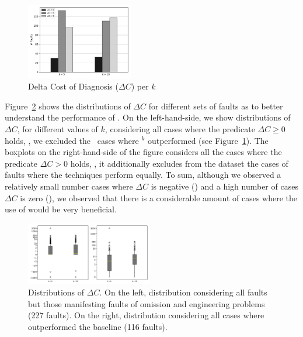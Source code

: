 \documentclass{article}
\begin{document}
\begin{figure}[h]
	\vspace{-0.3cm}
		\centering
		\includegraphics[width=0.415\textwidth]{figures/performance.pdf}
		\vspace{-0.4cm}
		\caption{Delta Cost of Diagnosis ($\Delta{}C$) per $k$}
		\label{fig:diagnosis}
\end{figure}

Figure~\ref{fig:boxplot} shows the distributions of $\Delta{}C$ for
different sets of faults as to better understand the performance of
. 
On the left-hand-side, we show distributions of
$\Delta{}C$, for different values of $k$, considering all cases where
the predicate $\Delta{}C\geq{}0$ holds, \ie{}, we excluded the
\numOutPerformed\ cases where \sfl{}$^{k}$ outperformed 
(see Figure~\ref{fig:diagnosis}). The boxplots on the right-hand-side
of the figure considers all the cases where the predicate
$\Delta{}C>0$ holds, \ie{}, it additionally excludes from the dataset
the cases of faults where the techniques perform equally.
 To sum,
although we observed a relatively small number cases where $\Delta{}C$
is negative (\numOutPerformed) and a high number of cases $\Delta{}C$
is zero (\numEquallyPerformed), we observed that there is a
considerable amount of cases where the use of  would be
very beneficial.

\begin{figure}[h]
		\vspace{-0.2cm}
		\centering
		\includegraphics[width=0.49\textwidth]{figures/boxplot.pdf}
		\vspace{-0.6cm}

		\caption{Distributions of $\Delta{}C$. On the left, distribution
        considering all faults but those manifesting faults of
        omission and engineering problems (227 faults). On the right,
        distribution considering all cases where 
        outperformed the baseline (116 faults).}
		\label{fig:boxplot}
		\vspace{-0.2cm}
\end{figure}
\end{document}
